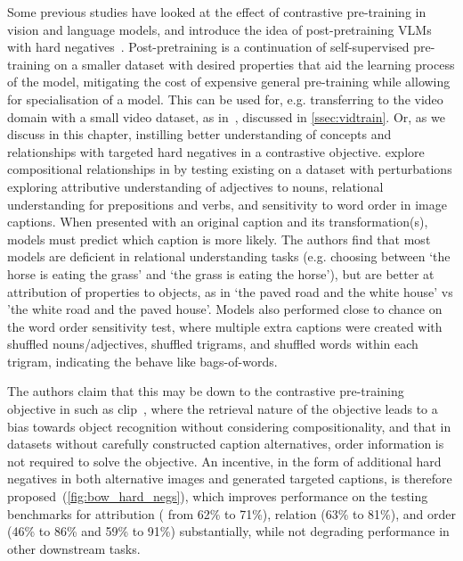 Some previous studies have looked at the effect of contrastive pre-training in
vision and language models, and introduce the idea of post-pretraining VLMs
with hard negatives~\citep{yuksekgonul2023when, momeni2023verbs,
bagad2023testoftime}. Post-pretraining is a continuation of self-supervised
pre-training on a smaller dataset with desired properties that aid the learning
process of the model, mitigating the cost of expensive general pre-training
while allowing for specialisation of a model. This can be used for, e.g.
transferring  to the video domain with a small video dataset,
as in~\citet{luo2022clip4clip}, discussed in \cref{ssec:vidtrain}. Or, as we
discuss in this chapter, instilling better understanding of concepts and
relationships with targeted hard negatives in a contrastive objective.
\citet{yuksekgonul2023when} explore compositional relationships in
 by testing existing  on a dataset with
perturbations exploring attributive understanding of adjectives to nouns,
relational understanding for prepositions and verbs, and sensitivity to word
order in image captions. When presented with an original caption and its
transformation(s), models must predict which caption is more likely. The
authors find that most models are deficient in relational understanding tasks
(e.g. choosing between `the horse is eating the grass' and `the grass is eating
the horse'), but are better at attribution of properties to objects, as in `the
paved road and the white house' vs 'the white road and the paved house'. Models
also performed close to chance on the word order sensitivity test, where
multiple extra captions were created with shuffled nouns/adjectives, shuffled
trigrams, and shuffled words within each trigram, indicating the
 behave like bags-of-words.

The authors claim that this may be down to the contrastive pre-training
objective in  such as \acrshort{clip}~\citep{radford2021clip},
where the retrieval nature of the objective leads to a bias towards object
recognition without considering compositionality, and that in datasets without
carefully constructed caption alternatives, order information is not required
to solve the objective. An incentive, in the form of additional hard negatives
in both alternative images and generated targeted captions, is therefore
proposed~(\cref{fig:bow_hard_negs}), which improves performance on the testing
benchmarks for attribution (%
from 62\% to 71\%), relation (63\% to 81\%), and order
(46\% to 86\% and 59\% to 91\%) substantially, while not degrading performance
in other downstream tasks.


